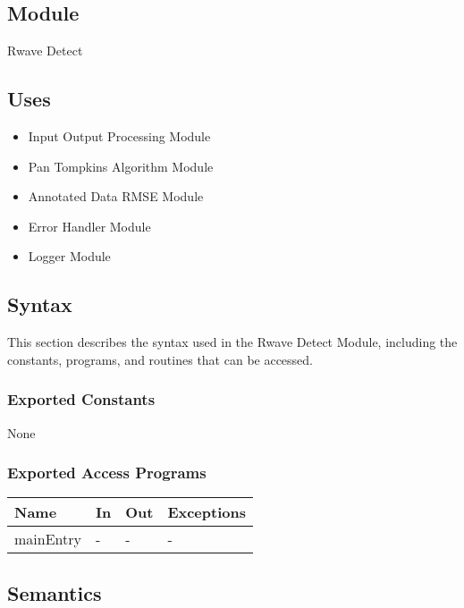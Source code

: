 \documentclass[12pt, titlepage]{article}
\begin{document}
\subsection{Module}

Rwave Detect

\subsection{Uses}

\begin{itemize}
\item Input Output Processing Module
\item Pan Tompkins Algorithm Module
\item Annotated Data RMSE Module
\item Error Handler Module
\item Logger Module
\end{itemize}

\subsection{Syntax}

This section describes the syntax used in the Rwave Detect Module, including the
constants, programs, and routines that can be accessed.

\subsubsection{Exported Constants}

None

\subsubsection{Exported Access Programs}

\begin{center}
\begin{tabular}{p{2cm} p{4cm} p{4cm} p{2cm}}
\hline
\textbf{Name} & \textbf{In} & \textbf{Out} & \textbf{Exceptions} \\
\hline
mainEntry & - & - & - \\
\hline
\end{tabular}
\end{center}

\subsection{Semantics}
\end{document}
